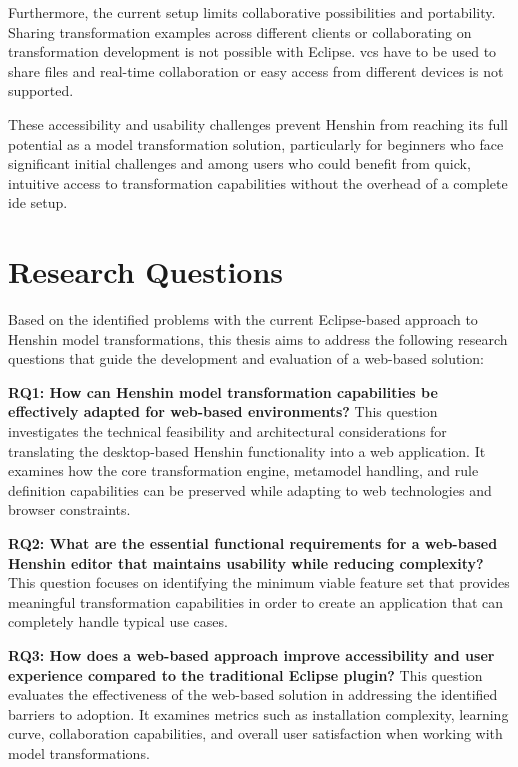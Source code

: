Furthermore, the current setup limits collaborative possibilities and portability. Sharing transformation examples across different clients or collaborating on transformation development is not possible with Eclipse. \ac{vcs} have to be used to share files and real-time collaboration or easy access from different devices is not supported.

These accessibility and usability challenges prevent Henshin from reaching its full potential as a model transformation solution, particularly for beginners who face significant initial challenges and among users who could benefit from quick, intuitive access to transformation capabilities without the overhead of a complete \ac{ide} setup.

\section{Research Questions}
\label{subsec:research-questions}

Based on the identified problems with the current Eclipse-based approach to Henshin model transformations, this thesis aims to address the following research questions that guide the development and evaluation of a web-based solution:

\textbf{RQ1: How can Henshin model transformation capabilities be effectively adapted for web-based environments?}
This question investigates the technical feasibility and architectural considerations for translating the desktop-based Henshin functionality into a web application. It examines how the core transformation engine, metamodel handling, and rule definition capabilities can be preserved while adapting to web technologies and browser constraints.


\textbf{RQ2: What are the essential functional requirements for a web-based Henshin editor that maintains usability while reducing complexity?}
This question focuses on identifying the minimum viable feature set that provides meaningful transformation capabilities in order to create an application that can completely handle typical use cases.


\textbf{RQ3: How does a web-based approach improve accessibility and user experience compared to the traditional Eclipse plugin?}
This question evaluates the effectiveness of the web-based solution in addressing the identified barriers to adoption. It examines metrics such as installation complexity, learning curve, collaboration capabilities, and overall user satisfaction when working with model transformations.


